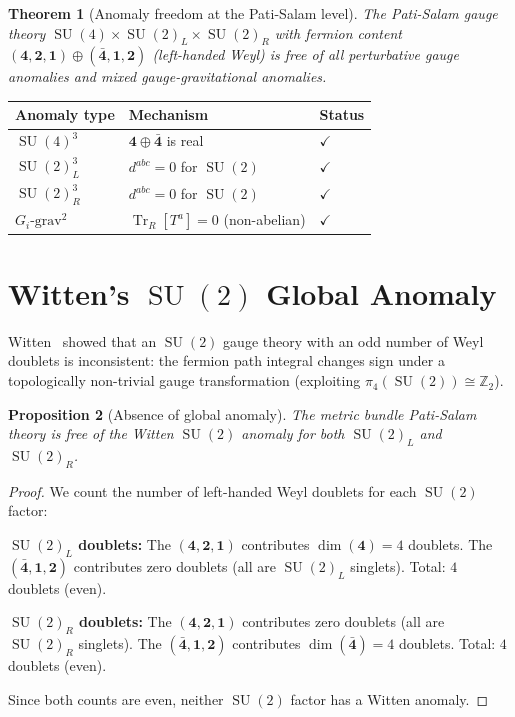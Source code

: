 \documentclass[12pt,a4paper]{article}
\newtheorem{theorem}{Theorem}[section]
\newtheorem{proposition}[theorem]{Proposition}
\theoremstyle{definition}
\newcommand{\Tr}{\operatorname{Tr}}
\newcommand{\SU}{\operatorname{SU}}
\newcommand{\Z}{\mathbb{Z}}
\begin{document}
\begin{theorem}[Anomaly freedom at the Pati-Salam level]
\label{thm:PS_anomaly_free}
The Pati-Salam gauge theory $\SU(4) \times \SU(2)_L \times \SU(2)_R$ with fermion content $(\mathbf{4}, \mathbf{2}, \mathbf{1}) \oplus (\bar{\mathbf{4}}, \mathbf{1}, \mathbf{2})$ (left-handed Weyl) is free of all perturbative gauge anomalies and mixed gauge-gravitational anomalies.
\end{theorem}

\begin{center}
\renewcommand{\arraystretch}{1.3}
\begin{tabular}{lll}
\toprule
\textbf{Anomaly type} & \textbf{Mechanism} & \textbf{Status} \\
\midrule
$\SU(4)^3$ & $\mathbf{4} \oplus \bar{\mathbf{4}}$ is real & $\checkmark$ \\
$\SU(2)_L^3$ & $d^{abc} = 0$ for $\SU(2)$ & $\checkmark$ \\
$\SU(2)_R^3$ & $d^{abc} = 0$ for $\SU(2)$ & $\checkmark$ \\
$G_i\text{-grav}^2$ & $\Tr_R[T^a] = 0$ (non-abelian) & $\checkmark$ \\
\bottomrule
\end{tabular}
\end{center}


\section{Witten's $\SU(2)$ Global Anomaly}
\label{sec:global_anomaly}

Witten~\cite{Witten1982} showed that an $\SU(2)$ gauge theory with an odd number of Weyl doublets is inconsistent: the fermion path integral changes sign under a topologically non-trivial gauge transformation (exploiting $\pi_4(\SU(2)) \cong \Z_2$).

\begin{proposition}[Absence of global anomaly]
\label{prop:witten}
The metric bundle Pati-Salam theory is free of the Witten $\SU(2)$ anomaly for both $\SU(2)_L$ and $\SU(2)_R$.
\end{proposition}

\begin{proof}
We count the number of left-handed Weyl doublets for each $\SU(2)$ factor:

\medskip
\noindent\textbf{$\SU(2)_L$ doublets:}
The $(\mathbf{4}, \mathbf{2}, \mathbf{1})$ contributes $\dim(\mathbf{4}) = 4$ doublets.
The $(\bar{\mathbf{4}}, \mathbf{1}, \mathbf{2})$ contributes zero doublets (all are $\SU(2)_L$ singlets).
Total: $4$ doublets (even).

\medskip
\noindent\textbf{$\SU(2)_R$ doublets:}
The $(\mathbf{4}, \mathbf{2}, \mathbf{1})$ contributes zero doublets (all are $\SU(2)_R$ singlets).
The $(\bar{\mathbf{4}}, \mathbf{1}, \mathbf{2})$ contributes $\dim(\bar{\mathbf{4}}) = 4$ doublets.
Total: $4$ doublets (even).

\medskip
Since both counts are even, neither $\SU(2)$ factor has a Witten anomaly.
\end{proof}
\end{document}
